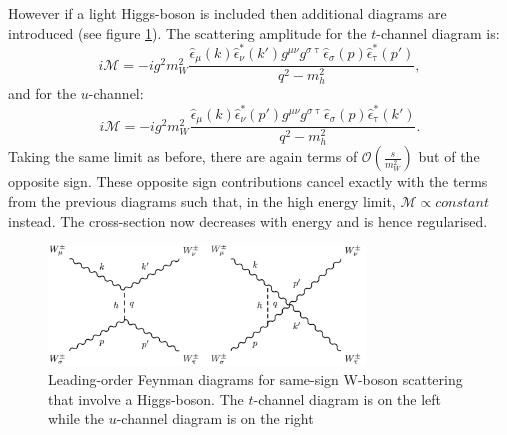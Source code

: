 However if a light Higgs-boson is included then additional diagrams are introduced (see figure \ref{diagrams higgs}). The scattering amplitude for the $t$-channel diagram is:
\begin{equation}
i \mathcal{M} = -ig^{2}m_{W}^{2}\frac{\hat{\epsilon}_{\mu}(k)\hat{\epsilon}_{\nu}^{*}(k')g^{\mu \nu}g^{\sigma \uptau}\hat{\epsilon}_{\sigma}(p)\hat{\epsilon}_{\uptau}^{*}(p')}{q^{2}-m_{h}^{2}},
\end{equation}
and for the $u$-channel:
\begin{equation}
i\mathcal{M} = -ig^{2}m_{W}^{2}\frac{\hat{\epsilon}_{\mu}(k)\hat{\epsilon}_{\nu}^{*}(p')g^{\mu \nu}g^{\sigma \uptau}\hat{\epsilon}_{\sigma}(p)\hat{\epsilon}_{\uptau}^{*}(k')}{q^{2}-m_{h}^{2}}.
\end{equation}
Taking the same limit as before, there are again terms of $\mathcal{O}\left( \frac{s}{m_{W}^{2}} \right)$ but of the opposite sign. These opposite sign contributions cancel exactly with the terms from the previous diagrams such that, in the high energy limit, $\mathcal{M} \propto constant$ instead. The cross-section now decreases with energy and is hence regularised.
\begin{figure}
\centering
\includegraphics[width=0.75\textwidth]{images/ssWW/diagrams_higgs.png}
\caption{Leading-order Feynman diagrams for same-sign W-boson scattering that involve a Higgs-boson. The $t$-channel diagram is on the left while the $u$-channel diagram is on the right}
\label{diagrams higgs}
\end{figure}